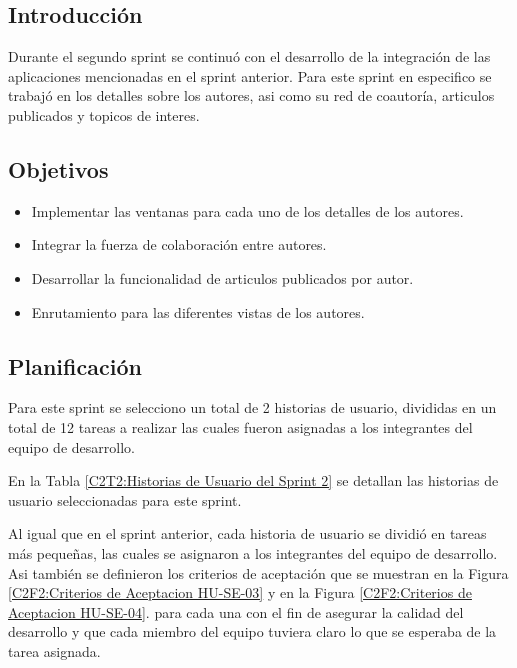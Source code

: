 
\subsection{Introducción}
Durante el segundo sprint se continuó con el desarrollo de la integración 
de las aplicaciones mencionadas en el sprint anterior.
Para este sprint en especifico se trabajó en los detalles sobre los autores, 
asi como su red de coautoría, articulos publicados y topicos de interes.

\subsection{Objetivos}
\begin{itemize}
    \item Implementar las ventanas para cada uno de los detalles de los autores.
    \item Integrar la fuerza de colaboración entre autores.
    \item Desarrollar la funcionalidad de articulos publicados por autor.
    \item Enrutamiento para las diferentes vistas de los autores.
\end{itemize}

\subsection{Planificación}
Para este sprint se selecciono un total de 2 historias de usuario, divididas en un total de
12 tareas a realizar las cuales fueron asignadas a los integrantes del equipo de desarrollo.

En la Tabla \ref{C2T2:Historias de Usuario del Sprint 2} se detallan las historias de usuario seleccionadas para este sprint.



Al igual que en el sprint anterior, cada historia de usuario se dividió en tareas más pequeñas,
las cuales se asignaron a los integrantes del equipo de desarrollo. Asi también se definieron
los criterios de aceptación que se muestran en la Figura \ref{C2F2:Criterios de Aceptacion HU-SE-03} y en la Figura \ref{C2F2:Criterios de Aceptacion HU-SE-04}.
para cada una con el fin de asegurar la calidad del desarrollo y
que cada miembro del equipo tuviera claro lo que se esperaba de la tarea asignada.

